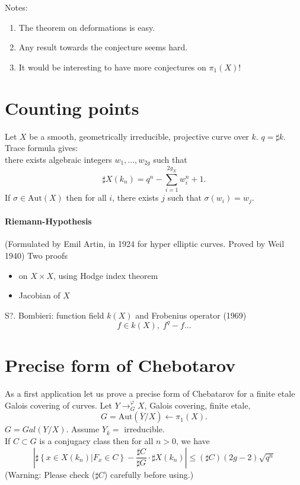 \medskip\noindent
Notes:
\begin{enumerate}
\item The theorem on deformations is easy.
\item Any result towards the conjecture seems hard.
\item It would be interesting to have more conjectures on $\pi_1(X)$!
\end{enumerate}




\section{Counting points}
\label{section-counting}

\noindent
Let $X$ be a smooth, geometrically irreducible,
projective curve over $k$. $q=\sharp k$. Trace formula gives:\\
there exists algebraic integers $w_1, \ldots, w_{2g}$ such that
$$\sharp X(k_n) = q^n-\sum_{i=1}^{2g_X}w_i^n+1.$$
If $\sigma\in \text{Aut}(X)$ then for all $i$, there exists $j$ such that
$\sigma(w_i)=w_j$.

\paragraph{Riemann-Hypothesis} (Formulated by Emil Artin, in 1924 for hyper
elliptic curves. Proved by Weil 1940) Two proofs
\begin{itemize}
\item on $X\times X$, using Hodge index theorem
\item Jacobian of $X$
\end{itemize}
S?. Bombieri: function field $k(X)$ and Frobenius operator (1969)
$$f\in k(X), \; f^q-f...$$


\section{Precise form of Chebotarov}
\label{section-vhebotarov}

\noindent
As a first application let us prove a precise form of Chebatarov
for a finite etale Galois covering of curves.
Let $Y\to^\varphi_G X$, Galois covering, finite etale,
$$G = \text{Aut}(\overline Y/X) \leftarrow \pi_1(X).$$
$G=Gal(Y/X)$.
Assume $Y_{\overline k} = $ irreducible. \\
If $C\subset G$ is a conjugacy class then for all $n>0$, we have
$$\left|\sharp\left\{x\in X(k_n)\left|F_x\in
C\right.\right\}-\frac{\sharp C}{\sharp G}\cdot\sharp X(k_n)\right|\leq (\sharp
C)(2g-2)\sqrt{q^n}$$
(Warning: Please check ($\sharp C$) carefully before using.)\\

